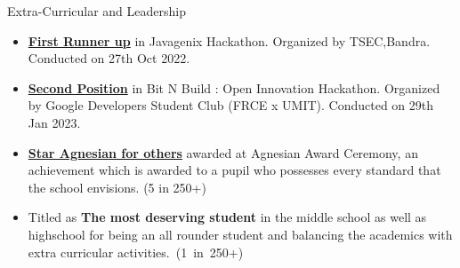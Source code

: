 \documentclass{resume} %
\begin{document}
\begin{rSection}{Extra-Curricular and Leadership} 
\begin{itemize}
    \item 	\href{https://www.linkedin.com/posts/dr-gopal-pardesi-9059968_tsec-it-dept-rocks-project-competition-activity-6997511090406371328-h9w5?utm_source=share&utm_medium=member_desktop/} {\textbf{First Runner up}} in Javagenix Hackathon. Organized by TSEC,Bandra. Conducted on 27th Oct 2022.
\end{itemize}
\begin{itemize}
    \item \href{https://www.linkedin.com/feed/update/urn:li:activity:7026184654688792576/} {\textbf{Second Position}} in Bit N Build : Open Innovation Hackathon. Organized by Google Developers Student Club (FRCE x UMIT). Conducted on 29th Jan 2023.
\end{itemize}
\begin{itemize}
    \item  \href{https://stagneshighschool.org/farewell-std-x/}{\textbf{Star Agnesian for others}} awarded at Agnesian Award Ceremony, an achievement which is awarded to a pupil who possesses every standard that the school envisions. (5 in 250+)
\item Titled as \textbf{The most deserving student} in the middle school as well as highschool for being an all rounder student and balancing the academics with extra curricular activities. (1 in 250+)
\end{itemize}
\end{rSection}
\end{document}
